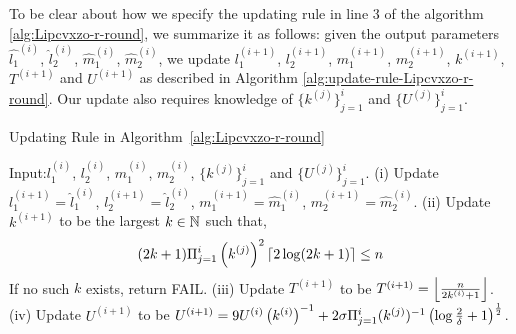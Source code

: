 To be clear about how we specify the updating rule in line 3 of the algorithm 
\ref{alg:Lipcvxzo-r-round}, we summarize it as follows: given the output 
parameters $\hat{l_1}^{(i)}$, $\hat{l}_2^{(i)}$, $\hat{m}_1^{(i)}$, $\hat{m}_2^{(i)}$, 
we update $l_1^{(i+1)}$, $l_2^{(i+1)}$, $m_1^{(i+1)}$, $m_2^{(i+1)}$, 
$k^{(i+1)}$, $T^{(i+1)}$ and $U^{(i+1)}$ as described in Algorithm 
\ref{alg:update-rule-Lipcvxzo-r-round}. Our update also requires
knowledge of $\{k^{(j)}\}_{j=1}^i$ and $\{U^{(j)}\}_{j=1}^i$.

\begin{algorithm}[htp]
\caption{Updating Rule in Algorithm~\ref{alg:Lipcvxzo-r-round}}
\begin{algorithmic}
  \Statex Input:$l_1^{(i)}$, $l_2^{(i)}$, $m_1^{(i)}$, $m_2^{(i)}$, 
  	$\{k^{(j)}\}_{j=1}^i$ and $\{U^{(j)}\}_{j=1}^i$.
  \State (i) Update $l_1^{(i+1)} = \hat{l}_1^{(i)}$, $l_2^{(i+1)} = \hat{l}_2^{(i)}$, 
  	$m_1^{(i+1)} = \hat{m}_1^{(i)}$, $m_2^{(i+1)} = \hat{m}_2^{(i)}$. 
  \State (ii) Update $k^{(i+1)}$ to be the largest $k \in \mathbb{N}$ such that, 
  	\begin{equation}
	\label{eqn:existence-of-k-r-round-zo-one-dim-ns}
		(2k + 1) \Pi_{j=1}^{i} \left(k^{(j)}\right)^2 \left\lceil{2 \log (2k+1) }\right\rceil \leq n
	\end{equation}
	 If no such $k$ exists, return FAIL. 
  \State (iii) Update $T^{(i+1)}$ to be $T^{(i+1)} = \left\lfloor{\frac{n}{2k^{(i)}+1}}\right\rfloor$.
  \State (iv) Update $U^{(i+1)}$ to be $U^{(i+1)} = 9U^{(i)} \left(k^{(i)}\right)^{-1} + 
	2\sigma \Pi_{j=1}^i (k^{(j)})^{-1} \left(\log \frac{2}{\delta} + 1\right)^{\frac{1}{2}}$.
\end{algorithmic}
\label{alg:update-rule-Lipcvxzo-r-round}
\end{algorithm}

